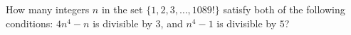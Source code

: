 How many integers $n$ in the set $\{1,2,3,\dots,1089!\}$ satisfy both of the following conditions: $4n^4-n$ is divisible by $3$, and $n^4-1$ is divisible by $5$?
